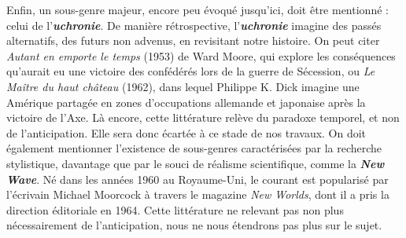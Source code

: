 \documentclass[letterpaper,portrait,12pt]{article}
\begin{document}
	Enfin, un sous-genre majeur, encore peu \'{e}voqu\'{e} jusqu'ici, doit \^{e}tre mentionn\'{e} : celui de l'\textbf{\emph{uchronie}}. De mani\`{e}re r\'{e}trospective, l'\textbf{\emph{uchronie}} imagine des pass\'{e}s alternatifs, des futurs non advenus, en revisitant notre histoire. On peut citer \emph{Autant en emporte le temps} (1953) de Ward Moore, qui explore les cons\'{e}quences qu'aurait eu une victoire des conf\'{e}d\'{e}r\'{e}s lors de la guerre de S\'{e}cession, ou \emph{Le Ma\^{i}tre du haut ch\^{a}teau} (1962), dans lequel Philippe K. Dick imagine une Am\'{e}rique partag\'{e}e en zones d'occupations allemande et japonaise apr\`{e}s la victoire de l'Axe. L\`{a} encore, cette litt\'{e}rature rel\`{e}ve du paradoxe temporel, et non de l'anticipation. Elle sera donc \'{e}cart\'{e}e \`{a} ce stade de nos travaux. On doit \'{e}galement mentionner l'existence de sous-genres caract\'{e}ris\'{e}es par la recherche stylistique, davantage que par le souci de r\'{e}alisme scientifique, comme la \textbf{\emph{New Wave}}. N\'{e} dans les ann\'{e}es 1960 au Royaume-Uni, le courant est popularis\'{e} par l'\'{e}crivain Michael Moorcock \`{a} travers le magazine \emph{New Worlds}, dont il a pris la direction \'{e}ditoriale en 1964. Cette litt\'{e}rature ne relevant pas non plus n\'{e}cessairement de l'anticipation, nous ne nous \'{e}tendrons pas plus sur le sujet.
\end{document}
